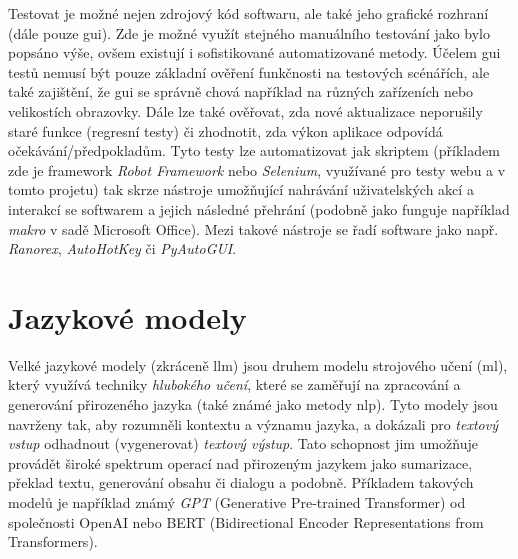 \documentclass[czech, ma, kiv, he, iso690numb, pdf, viewonly]{fasthesis}
\begin{document}
    Testovat je možné nejen zdrojový kód softwaru, ale také jeho grafické rozhraní (dále pouze \Acrshort{gui}). Zde je možné využít stejného manuálního testování jako bylo popsáno výše, ovšem existují i sofistikované automatizované metody. Účelem \Acrshort{gui} testů nemusí být pouze základní ověření funkčnosti na testových scénářích, ale také zajištění, že \Acrshort{gui} se správně chová například na různých zařízeních nebo velikostích obrazovky. Dále lze také ověřovat, zda nové aktualizace neporušily staré funkce (regresní testy) či zhodnotit, zda výkon aplikace odpovídá očekávání/předpokladům. Tyto testy lze automatizovat jak skriptem (příkladem zde je framework \textit{Robot Framework} nebo \textit{Selenium}, využívané pro testy webu a v tomto projetu) tak skrze nástroje umožňující nahrávání uživatelských akcí a interakcí se softwarem a jejich následné přehrání (podobně jako funguje například \textit{makro} v sadě Microsoft Office). Mezi takové nástroje se řadí software jako např. \textit{Ranorex}, \textit{AutoHotKey} či \textit{PyAutoGUI}. \cite{alegroth2016maintenance}


    \section{Jazykové modely} \label{sec:language_models}

    Velké jazykové modely (zkráceně \Gls{llm}) jsou druhem modelu strojového učení (\Acrshort{ml}), který využívá techniky \textit{hlubokého učení}, které se zaměřují na zpracování a generování přirozeného jazyka (také známé jako metody \Acrshort{nlp}). Tyto modely jsou navrženy tak, aby rozumněli kontextu a významu jazyka, a dokázali pro \textit{textový vstup} odhadnout (vygenerovat) \textit{textový výstup}. Tato schopnost jim umožňuje provádět široké spektrum operací nad přirozeným jazykem jako sumarizace, překlad textu, generování obsahu či dialogu a podobně. Příkladem takových modelů je například známý \textit{GPT} (Generative Pre-trained Transformer) od společnosti OpenAI nebo BERT (Bidirectional Encoder Representations from Transformers).
    \cite{devlin2019bert} \cite{googleML2023} \cite{cloudflareLLM2023}
\end{document}

